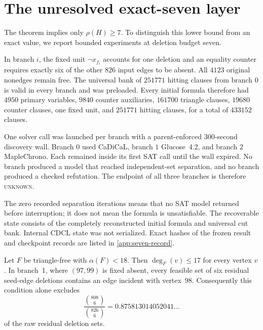 \section{The unresolved exact-seven layer}\label{sec:seven}

The theorem implies only \(\rho(H)\ge7\).  To distinguish this lower bound
from an exact value, we report bounded experiments at deletion budget seven.

In branch \(i\), the fixed unit \(\neg x_{f_i}\) accounts for one deletion
and an equality counter requires exactly six of the other \(826\) input edges
to be absent.  All \(4123\) original nonedges remain free.  The universal bank
of \(251771\) hitting clauses from branch \(0\) is valid in every branch and
was preloaded.  Every initial formula therefore had \(4950\) primary
variables, \(9840\) counter auxiliaries, \(161700\) triangle clauses,
\(19680\) counter clauses, one fixed unit, and \(251771\) hitting clauses, for
a total of \(433152\) clauses.

\begin{observation}
One solver call was launched per branch with a parent-enforced \(300\)-second
discovery wall.  Branch \(0\) used CaDiCaL, branch \(1\) Glucose~4.2, and
branch \(2\) MapleChrono.  Each remained inside its first SAT call until the
wall expired.  No branch produced a model that reached independent-set
separation, and no branch produced a checked refutation.  The endpoint of all
three branches is therefore \textsc{unknown}.
\end{observation}

The zero recorded separation iterations means that no SAT model returned
before interruption; it does not mean the formula is unsatisfiable.  The
recoverable state consists of the completely reconstructed initial formula
and universal cut bank.  Internal CDCL state was not serialized.  Exact
hashes of the frozen result and checkpoint records are listed in
\cref{app:seven-record}.

\begin{proposition}
Let \(F\) be triangle-free with \(\alpha(F)<18\).  Then
\(\deg_F(v)\le17\) for every vertex \(v\).  In branch~1, where
\((97,99)\) is fixed absent, every feasible set of six residual seed-edge
deletions contains an edge incident with vertex~\(98\).  Consequently this
condition alone excludes
\[
  \frac{\binom{808}{6}}{\binom{826}{6}}
  =0.875813014052041\ldots
\]
of the raw residual deletion sets.
\end{proposition}

